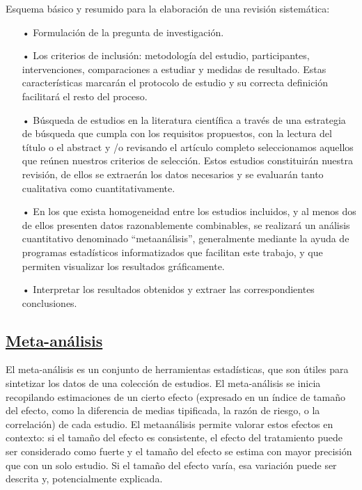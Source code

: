 \documentclass[12pt, a4paper, nofontenc, numbers=endperiod]{apa7}
\begin{document}
{	\setlength{\parindent}{1.27cm}Esquema básico y resumido para la elaboración de una revisión sistemática:
	{\doublespacing
		\begin{itemize}[leftmargin=1.70cm]
			\item[•] Formulación de la pregunta de investigación.
			\item[•] Los criterios de inclusión: metodología del estudio, participantes, intervenciones, comparaciones a estudiar y medidas de resultado. Estas características marcarán el protocolo de estudio y su correcta definición facilitará el resto del proceso.
			\item[•] Búsqueda de estudios en la literatura científica a través de una estrategia de búsqueda que cumpla con los requisitos propuestos, con la lectura del título o el abstract y /o revisando el artículo completo seleccionamos aquellos que reúnen nuestros criterios de selección. Estos estudios constituirán nuestra revisión, de ellos se extraerán los datos necesarios y se evaluarán tanto cualitativa como cuantitativamente.
			\item[•] En los que exista homogeneidad entre los estudios incluidos, y al menos dos de ellos presenten datos razonablemente combinables, se realizará un análisis cuantitativo denominado “metaanálisis”, generalmente mediante la ayuda de programas estadísticos informatizados que facilitan este trabajo, y que permiten visualizar los resultados gráficamente.
			\item[•] Interpretar los resultados obtenidos y extraer las correspondientes conclusiones. 
		
	\end{itemize}
}
		\subsection*{\normalsize \underline{Meta-análisis}}
	
	\setlength{\parindent}{1.27cm} El meta-análisis es un conjunto de herramientas estadísticas, que son útiles para sintetizar los datos de una colección de estudios. El meta-análisis se inicia recopilando estimaciones de un cierto efecto (expresado en un índice de tamaño del efecto, como la diferencia de medias tipificada, la razón de riesgo, o la correlación) de cada estudio. El metaanálisis permite valorar estos efectos en contexto: si el tamaño del efecto es consistente, el efecto del tratamiento puede ser considerado como fuerte y el tamaño del efecto se estima con mayor precisión que con un solo estudio. Si el tamaño del efecto varía, esa variación puede ser descrita y, potencialmente explicada.

}
\end{document}

